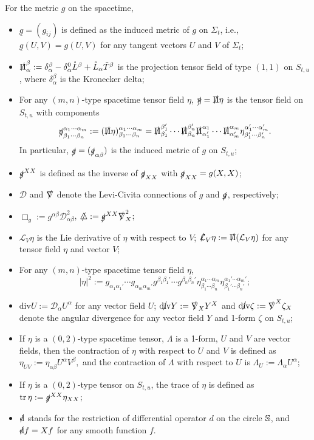 \documentclass[11pt,twoside]{article}
\def\al{\alpha}
\def\ds{\slashed{\operatorname{d}}}
\begin{document}
\begin{definition} For the metric $g$ on the spacetime,
\begin{itemize}
\item $\underline g=(g_{ij})$ is defined as the induced metric of $g$ on $\Sigma_{t}$, i.e.,
$\underline g(U,V)=g(U,V)$ for any tangent vectors $U$ and $V$ of $\Sigma_{t}$;
\item $\slashed \Pi_\al^\beta:=\delta_\al^\beta-\delta_\al^0\mathring L^\beta+\mathring L_\al\tilde{T}^\beta$ is the
projection tensor field of type $(1,1)$ on $S_{{t},u}$, where $\delta_\al^\beta$ is the Kronecker delta;
\item For any $(m,n)$-type
spacetime tensor field
$\eta$, $\slashed\eta=\slashed\Pi\eta$ is the tensor field on $S_{{t},u}$  with components $$\slashed\eta^{\al_1\cdots\al_m}_{\beta_1\cdots\beta_n}:=(\slashed\Pi\eta)^{\al_1\cdots\al_m}_{\beta_1\cdots\beta_n}
=\slashed\Pi_{\beta_1}^{\beta_1'}\cdots\slashed\Pi_{\beta_n}^{\beta_n'}
\slashed\Pi_{\al_1'}^{\al_1}\cdots\slashed\Pi_{\al_m'}^{\al_m}\eta^{\al_1'\cdots\al_m'}_{\beta_1'\cdots\beta_n'}.$$
In particular, $\slashed g=(\slashed g_{\al\beta})$ is the induced metric of $g$ on $S_{{t},u}$;
\item $\slashed g^{XX}$ is defined as the inverse of $\slashed g_{XX}$ with $\slashed g_{XX}=g(X, X)$;
\item $\mathscr D$ and $\slashed\nabla$ denote the Levi-Civita connections of $g$ and $\slashed g$, respectively;
\item $\Box_g:=g^{\al\beta}\mathscr{D}^2_{\al\beta}$, $\slashed\triangle:=\slashed g^{XX}\slashed\nabla^2_{X}$;
\item $\mathcal L_V\eta$ is the Lie derivative of $\eta$ with respect to $V${;} $\slashed{\mathcal L}_V\eta:=\slashed\Pi(\mathcal L_V\eta)$
for any tensor field $\eta$ and vector $V$;
\item For any $(m,n)$-type spacetime tensor field $\eta$,
$$
|\eta|^2:=g_{\al_1\al_1'}\cdots g_{\al_m\al_m'}g^{\beta_1\beta_1'}\cdots g^{\beta_n\beta_n'}\eta_{\beta_1\cdots\beta_n}^{\al_1\cdots\al_m}\eta_{\beta_1'\cdots\beta_n'}^{\al_1'\cdots\al_m'};
$$
\item $\text{div}U:=\mathscr D_\al U^\al$ for any vector field $U$; $\slashed{\text{div}}Y:=\slashed{\nabla}_X Y^X$
and $\slashed{\text{div}}\zeta:=\slashed\nabla^X\zeta_X$ denote the angular divergence for any vector field $Y$ and 1-form $\zeta$ on $S_{{t},u}$;
\item If $\eta$ is a $(0,2)$-type spacetime tensor, $\Lambda$ is a 1-form, $U$ and $V$ are vector fields, then the contraction
of $\eta$ with respect to $U$ and $V$ is defined as
$\eta_{UV}:=\eta_{\al\beta}U^{\al}V^{\beta},$
and the contraction of $\Lambda$ with respect to $U$ is
$\Lambda_U:=\Lambda_{\al}U^{\al}$;
\item If $\eta$ is a $(0,2)$-type tensor on $S_{t,u}$, the trace of $\eta$ is defined as
$\operatorname{tr}\eta:=\slashed g^{XX}\eta_{XX}$;
\item  $\ds$ stands for the restriction of differential operator $d$ on the circle $\Bbb S$, and $\ds f=Xf$ for any smooth function $f$.
\end{itemize}
\end{definition}
\end{document}
